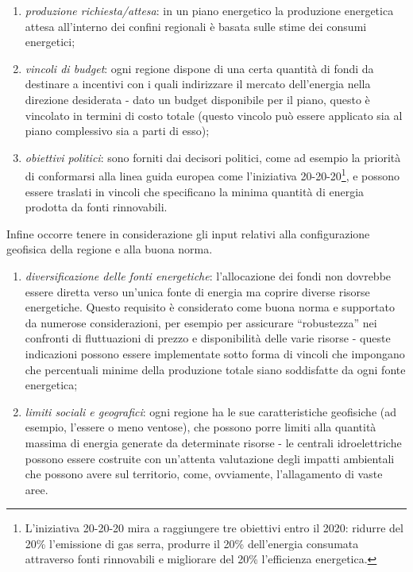 \documentclass[12pt,a4paper,openright,twoside]{report}
\begin{document}
\begin{enumerate}
\item \emph{produzione richiesta/attesa}: in un piano energetico la produzione energetica attesa all'interno  dei confini regionali è basata sulle stime dei consumi energetici;
\item \emph{vincoli di budget}: ogni regione dispone di una certa quantità di fondi da destinare a incentivi con i quali indirizzare il mercato dell'energia nella direzione desiderata - dato un budget disponibile per il piano, questo è vincolato in termini di costo totale (questo vincolo può essere applicato sia al piano complessivo sia a parti di esso);
\item \emph{obiettivi politici}: sono forniti dai decisori politici, come ad esempio la priorità di conformarsi alla linea guida europea come l'iniziativa 20-20-20\footnote{L'iniziativa 20-20-20 mira a raggiungere tre obiettivi entro il 2020: ridurre del 20\% l'emissione di gas serra, produrre il 20\% dell'energia consumata attraverso fonti rinnovabili e migliorare del 20\% l'efficienza energetica.}, e possono essere traslati in vincoli che specificano la minima quantità di energia prodotta da fonti rinnovabili.
\end{enumerate} 

Infine occorre tenere in considerazione gli input relativi alla configurazione geofisica della regione e alla buona norma.
\begin{enumerate}
\item \emph{diversificazione delle fonti energetiche}: l'allocazione dei fondi non dovrebbe essere diretta verso un'unica fonte di energia ma coprire diverse risorse energetiche. Questo requisito è considerato come buona norma e supportato da numerose considerazioni, per esempio per assicurare ``robustezza'' nei confronti di fluttuazioni di prezzo e disponibilità delle varie risorse - queste indicazioni possono essere implementate sotto forma di vincoli che impongano che percentuali minime della produzione totale siano soddisfatte da ogni fonte energetica;
\item \emph{limiti sociali e geografici}: ogni regione ha le sue caratteristiche geofisiche (ad esempio, l'essere o meno ventose), che possono porre limiti alla quantità massima di energia generate da determinate risorse - le centrali idroelettriche possono essere costruite con un'attenta valutazione degli impatti ambientali che possono avere sul territorio, come, ovviamente, l'allagamento di vaste aree.
\end{enumerate} 
\end{document}
